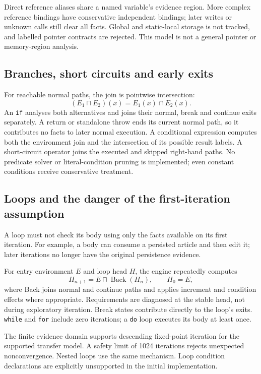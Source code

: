 \documentclass[11pt]{article}
\begin{document}
Direct reference aliases share a named variable's evidence region. More
complex reference bindings have conservative independent bindings; later
writes or unknown calls still clear all facts. Global and static-local storage
is not tracked, and labelled pointer contracts are rejected. This model is
not a general pointer or memory-region analysis.

\subsection{Branches, short circuits and early exits}
For reachable normal paths, the join is pointwise intersection:
\[
 (E_1\sqcap E_2)(x)=E_1(x)\cap E_2(x).
\]
An \texttt{if} analyses both alternatives and joins their normal, break and
continue exits separately. A return or standalone throw ends its current normal
path, so it contributes no facts to later normal execution. A conditional
expression computes both the environment join and the intersection of its
possible result labels. A short-circuit operator joins the executed and
skipped right-hand paths. No predicate solver or literal-condition pruning
is implemented; even constant conditions receive conservative treatment.

\subsection{Loops and the danger of the first-iteration assumption}
A loop must not check its body using only the facts available on its first
iteration. For example, a body can consume a persisted article and then edit
it; later iterations no longer have the original persistence evidence.

For entry environment $E$ and loop head $H$, the engine repeatedly computes
\[
 H_{n+1}=E\sqcap\operatorname{Back}(H_n),\qquad H_0=E,
\]
where Back joins normal and continue paths and applies increment and condition
effects where appropriate. Requirements are diagnosed at the stable head,
not during exploratory iteration. Break states contribute directly to the
loop's exits. \texttt{while} and \texttt{for} include zero iterations; a
\texttt{do} loop executes its body at least once.

The finite evidence domain supports descending fixed-point iteration for
the supported transfer model. A safety limit of 1024 iterations rejects
unexpected nonconvergence. Nested loops use the same mechanism. Loop condition
declarations are explicitly unsupported in the initial implementation.
\end{document}
